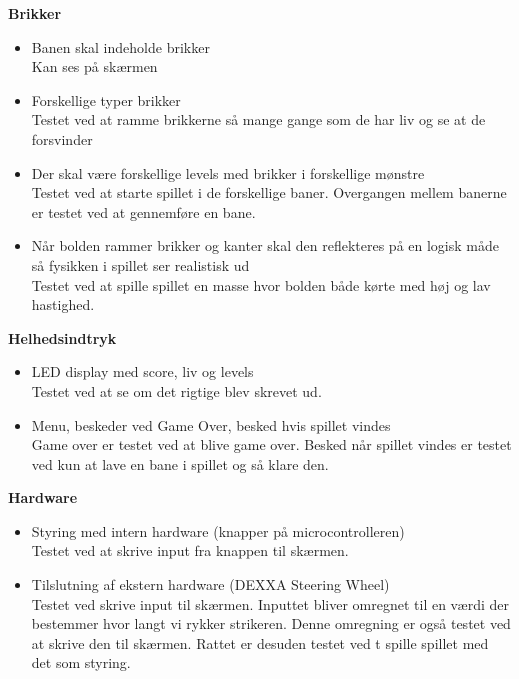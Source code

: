 \textbf{Brikker}
\begin{itemize}
\item Banen skal indeholde brikker
\\ Kan ses på skærmen 
\item Forskellige typer brikker
\\ Testet ved at ramme brikkerne så mange gange som de har liv og se at de forsvinder
\item Der skal være forskellige levels med brikker i forskellige mønstre
\\ Testet ved at starte spillet i de forskellige baner. Overgangen mellem banerne er testet ved at gennemføre en bane. 
\item Når bolden rammer brikker og kanter skal den reflekteres på en logisk måde så fysikken i spillet ser realistisk ud
\\ Testet ved at spille spillet en masse hvor bolden både kørte med høj og lav hastighed. 
\end{itemize}

\textbf{Helhedsindtryk}
\begin{itemize}
\item LED display med score, liv og levels
\\ Testet ved at se om det rigtige blev skrevet ud.
\item Menu, beskeder ved Game Over, besked hvis spillet vindes
\\ Game over er testet ved at blive game over. Besked når spillet vindes er testet ved kun at lave en bane i spillet og så klare den. 
\end{itemize}

\textbf{Hardware}
\begin{itemize}
\item Styring med intern hardware (knapper på microcontrolleren)
\\ Testet ved at skrive input fra knappen til skærmen. 
\item Tilslutning af ekstern hardware (DEXXA Steering Wheel)
\\ Testet ved skrive input til skærmen. Inputtet bliver omregnet til en værdi der bestemmer hvor langt vi rykker strikeren. Denne omregning er også testet ved at skrive den til skærmen. Rattet er desuden testet ved t spille spillet med det som styring. 
\end{itemize}
	
	
	

